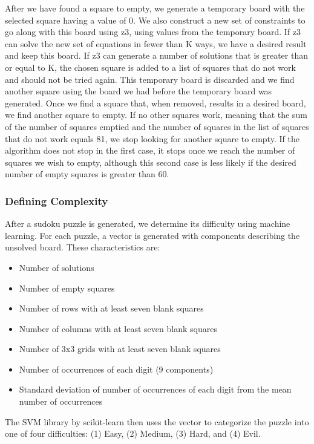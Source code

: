 After we have found a square to empty, we generate a temporary board
with the selected square having a value of 0. We also construct a new set of
constraints to go along with this board using z3, using values from the temporary board. If z3 can solve the
new set of equations in fewer than K ways, we have a desired result and keep this board. If z3 can generate a number of solutions that is
greater than or equal to K, the chosen square is added to a list of
squares that do not work and should not be tried again. This temporary
board is discarded and we find another square using the board we had
before the temporary board was generated. Once we find a square that,
when removed, results in a desired board, we find another square to
empty. If no other squares work, meaning that the sum of the number of squares
emptied and the number of squares in the list of squares that do not
work equals 81, we stop looking for another square to empty. If the
algorithm does not stop in the first case, it stops once we reach the
number of squares we wish to empty, although this second case is less
likely if the desired number of empty squares is greater than 60.

\subsubsection{Defining Complexity}
After a sudoku puzzle is generated, we determine its difficulty using
machine learning. For each puzzle, a vector is generated with
components describing the unsolved board. These characteristics are:

\singlespace
\begin{itemize}
\item Number of solutions
\item Number of empty squares
\item Number of rows with at least seven blank squares
\item Number of columns with at least seven blank squares
\item Number of 3x3 grids with at least seven blank squares
\item Number of occurrences of each digit (9 components)
\item Standard deviation of number of occurrences of each digit from the mean number of occurrences
\end{itemize}
\doublespace

The SVM library by scikit-learn then uses the vector to categorize the
puzzle into one of four difficulties: (1) Easy, (2) Medium, (3) Hard,
and (4) Evil.

